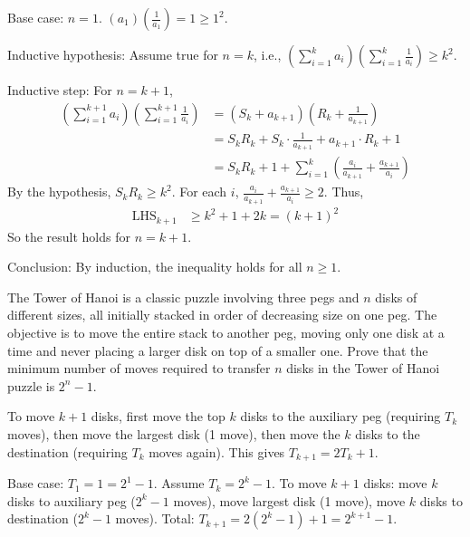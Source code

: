 \begin{solution}[Sketch]
Base case: $n=1$. $(a_1)\left(\frac{1}{a_1}\right) = 1 \geq 1^2$.

Inductive hypothesis: Assume true for $n=k$, i.e., $\left( \sum_{i=1}^k a_i \right) \left( \sum_{i=1}^k \frac{1}{a_i} \right) \geq k^2$.

Inductive step: For $n=k+1$,
\begin{align*}
\left( \sum_{i=1}^{k+1} a_i \right) \left( \sum_{i=1}^{k+1} \frac{1}{a_i} \right) &= \left( S_k + a_{k+1} \right) \left( R_k + \frac{1}{a_{k+1}} \right) \\
&= S_k R_k + S_k \cdot \frac{1}{a_{k+1}} + a_{k+1} \cdot R_k + 1 \\
&= S_k R_k + 1 + \sum_{i=1}^k \left( \frac{a_i}{a_{k+1}} + \frac{a_{k+1}}{a_i} \right)
\end{align*}
By the hypothesis, $S_k R_k \geq k^2$. For each $i$, $\frac{a_i}{a_{k+1}} + \frac{a_{k+1}}{a_i} \geq 2$. Thus,
\begin{align*}
	\text{LHS}_{k+1} &\geq k^2 + 1 + 2k = (k+1)^2
\end{align*}
So the result holds for $n=k+1$.

Conclusion: By induction, the inequality holds for all $n \geq 1$.
\end{solution}

\begin{problem}
The Tower of Hanoi is a classic puzzle involving three pegs and $n$ disks of different sizes, all initially stacked in order of decreasing size on one peg. The objective is to move the entire stack to another peg, moving only one disk at a time and never placing a larger disk on top of a smaller one.
Prove that the minimum number of moves required to transfer $n$ disks in the Tower of Hanoi puzzle is $2^n - 1$.
\end{problem}

\begin{hint}
To move $k+1$ disks, first move the top $k$ disks to the auxiliary peg (requiring $T_k$ moves), then move the largest disk (1 move), then move the $k$ disks to the destination (requiring $T_k$ moves again). This gives $T_{k+1} = 2T_k + 1$.
\end{hint}

\begin{solution}[Sketch]
Base case: $T_1 = 1 = 2^1 - 1$. Assume $T_k = 2^k - 1$. To move $k+1$ disks: move $k$ disks to auxiliary peg ($2^k-1$ moves), move largest disk (1 move), move $k$ disks to destination ($2^k-1$ moves). Total: $T_{k+1} = 2(2^k-1) + 1 = 2^{k+1} - 1$.
\end{solution}

